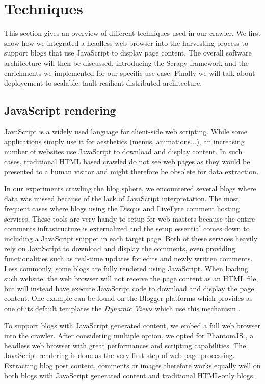 \section{Techniques}

This section gives an overview of different techniques used in our crawler. We first show how we integrated a headless web browser into the harvesting process to support blogs that use JavaScript to display page content. The overall software architecture will then be discussed, introducing the Scrapy framework and the enrichments we implemented for our specific use case. Finally we will talk about deployement to scalable, fault resilient distributed architecture.


\subsection{JavaScript rendering}
JavaScript is a widely used language for client-side web scripting. While some applications simply use it for aesthetics (menus, animations...), an increasing number of websites use JavaScript to download and display content. In such cases, traditional HTML based crawled do not see web pages as they would be presented to a human visitor and might therefore be obsolete for data extraction.

In our experiments crawling the blog sphere, we encountered several blogs where data was missed because of the lack of JavaScript interpretation. The most frequent cases where blogs using the Disqus \cite{disqus2013} and LiveFyre \cite{livefyre2013} comment hosting services. These tools are very handy to setup for web-masters because the entire comments infrastructure is externalized and the setup essential comes down to including a JavaScript snippet in each target page. Both of these services heavily rely on JavaScript to download and display the comments, even providing functionalities such as real-time updates for edits and newly written comments. Less commonly, some blogs are fully rendered using JavaScript. When loading such website, the web browser will not receive the page content as an HTML file, but will instead have execute JavaScript code to download and display the page content. One example can be found on the Blogger platforms which provides as one of its default templates the \emph{Dynamic Views} which use this mechanism \cite{antinharasymiv2011}.

To support blogs with JavaScript generated content, we embed a full web browser into the crawler. After considering multiple option, we opted for PhantomJS \cite{phantomjs2013}, a headless web browser with great performances and scripting capabilities. The JavaScript rendering is done as the very first step of web page processing. Extracting blog post content, comments or images therefore works equally well on both blogs with JavaScript generated content and traditional HTML-only blogs.


